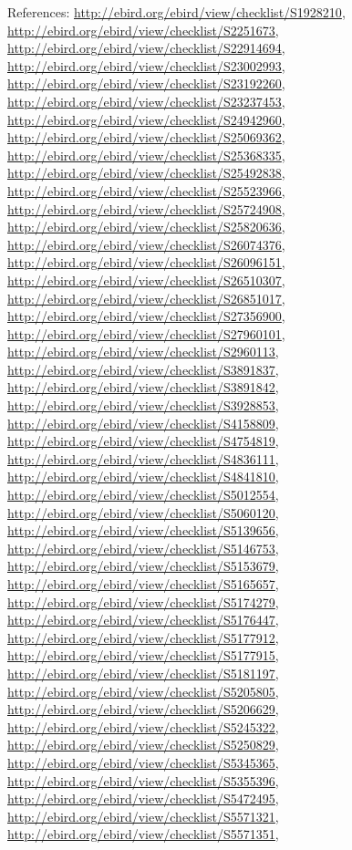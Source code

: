 \documentclass[9pt, article]{memoir}
\begin{document}
\begin{multicols}{2}
References: 
\url{http://ebird.org/ebird/view/checklist/S1928210}, 
\url{http://ebird.org/ebird/view/checklist/S2251673}, 
\url{http://ebird.org/ebird/view/checklist/S22914694}, 
\url{http://ebird.org/ebird/view/checklist/S23002993}, 
\url{http://ebird.org/ebird/view/checklist/S23192260}, 
\url{http://ebird.org/ebird/view/checklist/S23237453}, 
\url{http://ebird.org/ebird/view/checklist/S24942960}, 
\url{http://ebird.org/ebird/view/checklist/S25069362}, 
\url{http://ebird.org/ebird/view/checklist/S25368335}, 
\url{http://ebird.org/ebird/view/checklist/S25492838}, 
\url{http://ebird.org/ebird/view/checklist/S25523966}, 
\url{http://ebird.org/ebird/view/checklist/S25724908}, 
\url{http://ebird.org/ebird/view/checklist/S25820636}, 
\url{http://ebird.org/ebird/view/checklist/S26074376}, 
\url{http://ebird.org/ebird/view/checklist/S26096151}, 
\url{http://ebird.org/ebird/view/checklist/S26510307}, 
\url{http://ebird.org/ebird/view/checklist/S26851017}, 
\url{http://ebird.org/ebird/view/checklist/S27356900}, 
\url{http://ebird.org/ebird/view/checklist/S27960101}, 
\url{http://ebird.org/ebird/view/checklist/S2960113}, 
\url{http://ebird.org/ebird/view/checklist/S3891837}, 
\url{http://ebird.org/ebird/view/checklist/S3891842}, 
\url{http://ebird.org/ebird/view/checklist/S3928853}, 
\url{http://ebird.org/ebird/view/checklist/S4158809}, 
\url{http://ebird.org/ebird/view/checklist/S4754819}, 
\url{http://ebird.org/ebird/view/checklist/S4836111}, 
\url{http://ebird.org/ebird/view/checklist/S4841810}, 
\url{http://ebird.org/ebird/view/checklist/S5012554}, 
\url{http://ebird.org/ebird/view/checklist/S5060120}, 
\url{http://ebird.org/ebird/view/checklist/S5139656}, 
\url{http://ebird.org/ebird/view/checklist/S5146753}, 
\url{http://ebird.org/ebird/view/checklist/S5153679}, 
\url{http://ebird.org/ebird/view/checklist/S5165657}, 
\url{http://ebird.org/ebird/view/checklist/S5174279}, 
\url{http://ebird.org/ebird/view/checklist/S5176447}, 
\url{http://ebird.org/ebird/view/checklist/S5177912}, 
\url{http://ebird.org/ebird/view/checklist/S5177915}, 
\url{http://ebird.org/ebird/view/checklist/S5181197}, 
\url{http://ebird.org/ebird/view/checklist/S5205805}, 
\url{http://ebird.org/ebird/view/checklist/S5206629}, 
\url{http://ebird.org/ebird/view/checklist/S5245322}, 
\url{http://ebird.org/ebird/view/checklist/S5250829}, 
\url{http://ebird.org/ebird/view/checklist/S5345365}, 
\url{http://ebird.org/ebird/view/checklist/S5355396}, 
\url{http://ebird.org/ebird/view/checklist/S5472495}, 
\url{http://ebird.org/ebird/view/checklist/S5571321}, 
\url{http://ebird.org/ebird/view/checklist/S5571351}, 

\end{multicols}
\end{document}
